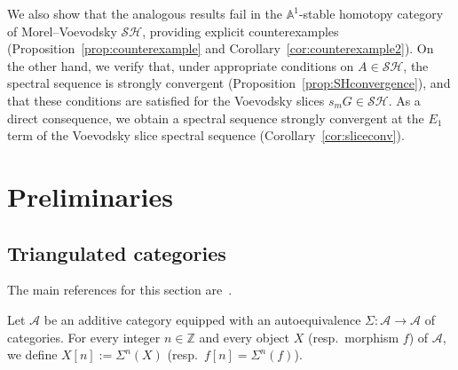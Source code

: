 \documentclass[12pt,a4paper]{article}
\theoremstyle{definition}
\newcommand{\SH}{\mathcal{SH}}
\newcommand{\Z}{\mathbb{Z}}
\begin{document}
We also show that the analogous results fail in the $\mathbb{A}^1$-stable homotopy
category of Morel–Voevodsky $\SH$, providing explicit counterexamples
(Proposition~\ref{prop:counterexample} and Corollary~\ref{cor:counterexample2}).
On the other hand, we verify that, under appropriate conditions on $A\in\SH$, the
spectral sequence is strongly convergent
(Proposition~\ref{prop:SHconvergence}), and that these conditions are satisfied
for the Voevodsky slices $s_mG\in\SH$.  As a direct consequence, we obtain a
spectral sequence strongly convergent at the $E_1$ term of the Voevodsky slice
spectral sequence (Corollary~\ref{cor:sliceconv}).

\section{Preliminaries}

\subsection{Triangulated categories}

The main references for this section are~\cite{Nee96,BBD}.

Let $\mathcal{A}$ be an additive category equipped with an autoequivalence
$\Sigma:\mathcal{A}\to\mathcal{A}$ of categories.  For every integer $n\in\Z$ and
every object $X$ (resp.\ morphism $f$) of $\mathcal{A}$, we define
$X[n]:=\Sigma^n(X)$ (resp.\ $f[n]=\Sigma^n(f)$).
\end{document}
